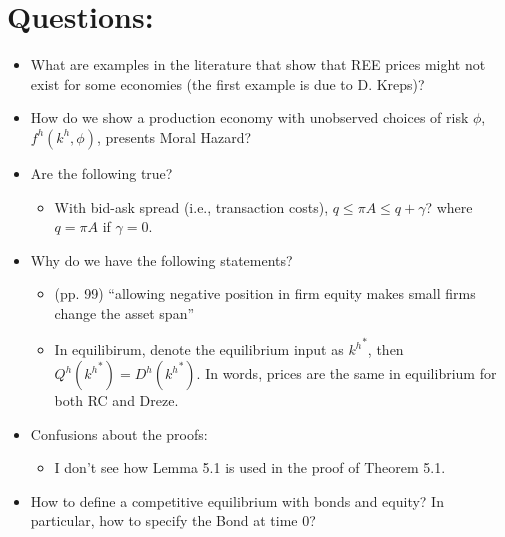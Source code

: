 \chapter{Questions:}
\begin{itemize}
    \item What are examples in the literature that show that REE prices might not exist for some economies (the first example is due to D. Kreps)?
    \item How do we show a production economy with unobserved choices of risk $\phi$, $f^h(k^h, \phi)$, presents Moral Hazard?
    \item Are the following true?
    \begin{itemize}
        \item With bid-ask spread (i.e., transaction costs), $q \leq \pi A \leq q + \gamma$?
        where $q = \pi A$ if $\gamma = 0$.
    \end{itemize}
    \item Why do we have the following statements?
    \begin{itemize}
        \item (pp. 99) ``allowing negative position in firm equity makes small firms change the asset span''
        \item In equilibirum, denote the equilibrium input as ${k^h}^*$, then $Q^h({k^h}^*) = D^h({k^h}^*)$.
        In words, prices are the same in equilibrium for both RC and Dreze.
    \end{itemize}
    \item Confusions about the proofs:
    \begin{itemize}
        \item I don't see how Lemma 5.1 is used in the proof of Theorem 5.1.
    \end{itemize}
    \item How to define a competitive equilibrium with bonds and equity? 
    In particular, how to specify the Bond at time 0?
\end{itemize}


